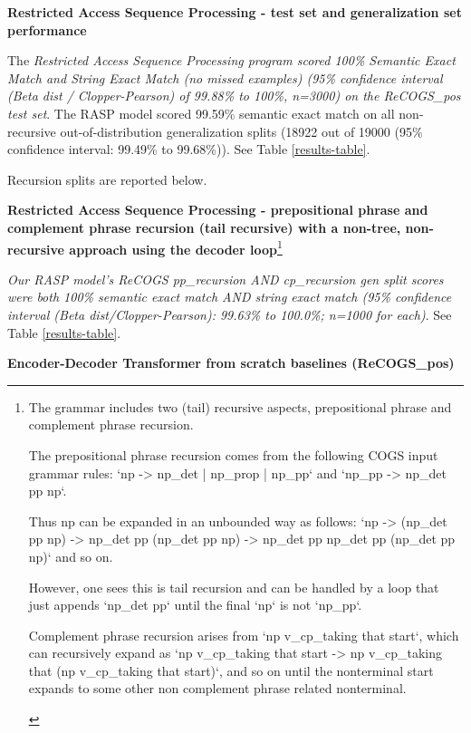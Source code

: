 \documentclass[11pt]{article}
\begin{document}
\textbf{ Restricted Access Sequence Processing - test set and generalization set performance}

The \textit{Restricted Access Sequence Processing program scored 100\% Semantic Exact Match and String Exact Match (no missed examples) (95\% confidence interval (Beta dist / Clopper-Pearson) of 99.88\% to 100\%, n=3000) on the ReCOGS\_pos test set}. The RASP model scored 99.59\% semantic exact match on all non-recursive out-of-distribution generalization splits (18922 out of 19000 (95\% confidence interval: 99.49\% to 99.68\%)). See Table \ref{results-table}.

Recursion splits are reported below.

\textbf{Restricted Access Sequence Processing - prepositional phrase and complement phrase recursion (tail recursive) with a non-tree, non-recursive approach using the decoder loop}\footnote{\begin{footnotesize}The grammar includes two (tail) recursive aspects, prepositional phrase and complement phrase recursion.

The prepositional phrase recursion comes from the following COGS input grammar rules: `np -> np\_det | np\_prop | np\_pp` and `np\_pp -> np\_det pp np`.

Thus np can be expanded in an unbounded way as follows: `np -> (np\_det pp np) -> np\_det pp (np\_det pp np) -> np\_det pp np\_det pp (np\_det pp np)` and so on.

However, one sees this is tail recursion and can be handled by a loop that just appends `np\_det pp` until the final `np` is not `np\_pp`.

Complement phrase recursion 
arises from `np v\_cp\_taking that start`, 
which can recursively expand as `np v\_cp\_taking that start -> np v\_cp\_taking that (np v\_cp\_taking that start)`, and so on until the nonterminal start expands to some other non complement phrase related nonterminal.
\end{footnotesize}
}

\textit{Our RASP model's ReCOGS pp\_recursion AND cp\_recursion gen split scores were both 100\% semantic exact match AND string exact match (95\% confidence interval (Beta dist/Clopper-Pearson): 99.63\% to 100.0\%; n=1000 for each)}. See Table \ref{results-table}.

\textbf{\cite{Wu2023} Encoder-Decoder Transformer from scratch baselines (ReCOGS\_pos)}
\end{document}
